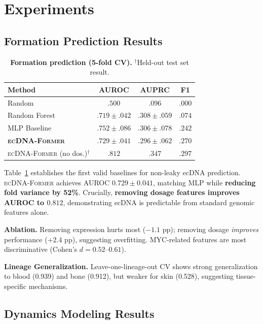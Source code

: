 \documentclass[runningheads]{llncs}
\newcommand{\former}{\textsc{ecDNA-Former}}
\begin{document}
\section{Experiments}
\label{sec:experiments}

\subsection{Formation Prediction Results}

\begin{table}[t]
\caption{\textbf{Formation prediction (5-fold CV).} $^\dagger$Held-out test set result.}
\label{tab:formation}
\centering
\footnotesize
\begin{tabular}{@{}lccc@{}}
\toprule
Method & AUROC & AUPRC & F1 \\
\midrule
Random & $.500$ & $.096$ & $.000$ \\
Random Forest & $.719 \pm .042$ & $.308 \pm .059$ & $.074$ \\
MLP Baseline & $.752 \pm .086$ & $.306 \pm .078$ & $.242$ \\
\textbf{\former{}} & $.729 \pm .041$ & $\mathbf{.296 \pm .062}$ & $\mathbf{.270}$ \\
\former{} (no dos.)$^\dagger$ & $\mathbf{.812}$ & $.347$ & $.297$ \\
\bottomrule
\end{tabular}
\end{table}

Table~\ref{tab:formation} establishes the first valid baselines for non-leaky ecDNA prediction. \former{} achieves AUROC $0.729 \pm 0.041$, matching MLP while \textbf{reducing fold variance by 52\%}. Crucially, \textbf{removing dosage features improves AUROC to $0.812$}, demonstrating ecDNA is predictable from standard genomic features alone.

\textbf{Ablation.} Removing expression hurts most ($-1.1$ pp); removing dosage \textit{improves} performance ($+2.4$ pp), suggesting overfitting. MYC-related features are most discriminative (Cohen's $d = 0.52$--$0.61$).

\textbf{Lineage Generalization.} Leave-one-lineage-out CV shows strong generalization to blood (0.939) and bone (0.912), but weaker for skin (0.528), suggesting tissue-specific mechanisms.

\subsection{Dynamics Modeling Results}
\end{document}
